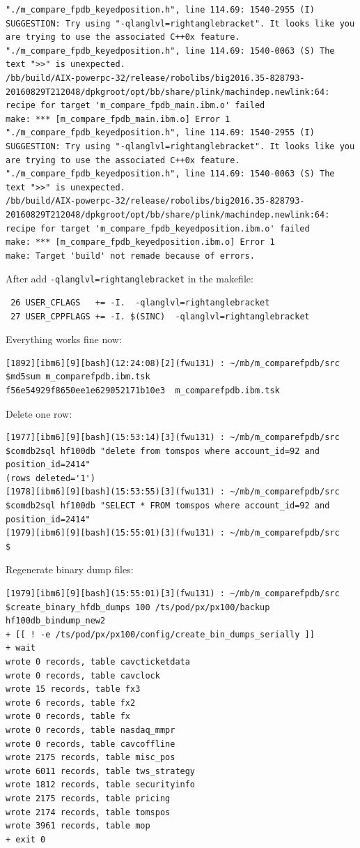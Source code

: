\documentclass[8pt,]{article}
\begin{document}
\begin{verbatim}
"./m_compare_fpdb_keyedposition.h", line 114.69: 1540-2955 (I) SUGGESTION: Try using "-qlanglvl=rightanglebracket". It looks like you are trying to use the associated C++0x feature.
"./m_compare_fpdb_keyedposition.h", line 114.69: 1540-0063 (S) The text ">>" is unexpected.
/bb/build/AIX-powerpc-32/release/robolibs/big2016.35-828793-20160829T212048/dpkgroot/opt/bb/share/plink/machindep.newlink:64: recipe for target 'm_compare_fpdb_main.ibm.o' failed
make: *** [m_compare_fpdb_main.ibm.o] Error 1
"./m_compare_fpdb_keyedposition.h", line 114.69: 1540-2955 (I) SUGGESTION: Try using "-qlanglvl=rightanglebracket". It looks like you are trying to use the associated C++0x feature.
"./m_compare_fpdb_keyedposition.h", line 114.69: 1540-0063 (S) The text ">>" is unexpected.
/bb/build/AIX-powerpc-32/release/robolibs/big2016.35-828793-20160829T212048/dpkgroot/opt/bb/share/plink/machindep.newlink:64: recipe for target 'm_compare_fpdb_keyedposition.ibm.o' failed
make: *** [m_compare_fpdb_keyedposition.ibm.o] Error 1
make: Target 'build' not remade because of errors.
\end{verbatim}

After add \texttt{-qlanglvl=rightanglebracket} in the makefile:

\begin{verbatim}
 26 USER_CFLAGS   += -I.  -qlanglvl=rightanglebracket
 27 USER_CPPFLAGS += -I. $(SINC)  -qlanglvl=rightanglebracket
\end{verbatim}

Everything works fine now:

\begin{verbatim}
[1892][ibm6][9][bash](12:24:08)[2](fwu131) : ~/mb/m_comparefpdb/src
$md5sum m_comparefpdb.ibm.tsk
f56e54929f8650ee1e629052171b10e3  m_comparefpdb.ibm.tsk
\end{verbatim}

Delete one row:

\begin{verbatim}
[1977][ibm6][9][bash](15:53:14)[3](fwu131) : ~/mb/m_comparefpdb/src
$comdb2sql hf100db "delete from tomspos where account_id=92 and position_id=2414"
(rows deleted='1')
[1978][ibm6][9][bash](15:53:55)[3](fwu131) : ~/mb/m_comparefpdb/src
$comdb2sql hf100db "SELECT * FROM tomspos where account_id=92 and position_id=2414"
[1979][ibm6][9][bash](15:55:01)[3](fwu131) : ~/mb/m_comparefpdb/src
$
\end{verbatim}

Regenerate binary dump files:

\begin{verbatim}
[1979][ibm6][9][bash](15:55:01)[3](fwu131) : ~/mb/m_comparefpdb/src
$create_binary_hfdb_dumps 100 /ts/pod/px/px100/backup hf100db_bindump_new2
+ [[ ! -e /ts/pod/px/px100/config/create_bin_dumps_serially ]]
+ wait
wrote 0 records, table cavcticketdata
wrote 0 records, table cavclock
wrote 15 records, table fx3
wrote 6 records, table fx2
wrote 0 records, table fx
wrote 0 records, table nasdaq_mmpr
wrote 0 records, table cavcoffline
wrote 2175 records, table misc_pos
wrote 6011 records, table tws_strategy
wrote 1812 records, table securityinfo
wrote 2175 records, table pricing
wrote 2174 records, table tomspos
wrote 3961 records, table mop
+ exit 0
\end{verbatim}
\end{document}
